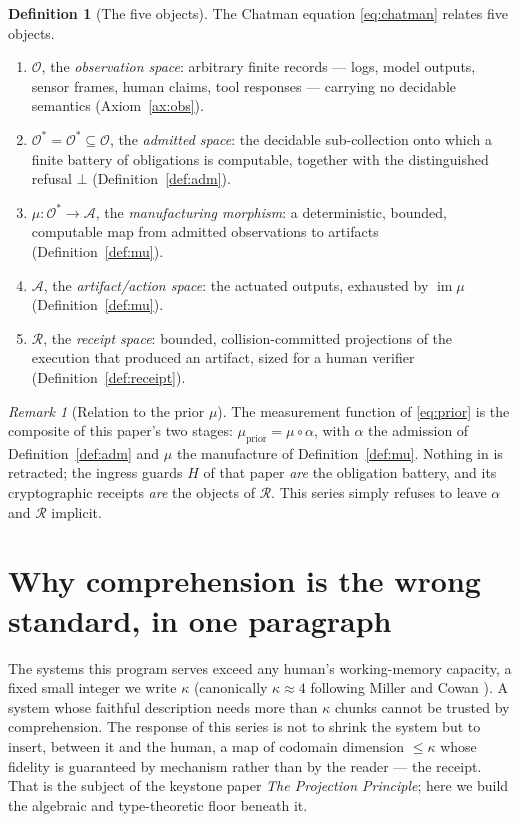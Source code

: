 \documentclass[11pt,oneside]{book}
\theoremstyle{definition}
\newtheorem{definition}{Definition}[chapter]
\theoremstyle{plain}
\theoremstyle{remark}
\newtheorem*{remark}{Remark}
\newcommand{\Obs}{\mathcal{O}}                 %
\newcommand{\Adm}{\mathcal{O}^{*}}             %
\newcommand{\Act}{\mathcal{A}}                 %
\newcommand{\Rec}{\mathcal{R}}                 %
\newcommand{\muop}{\mu}                        %
\newcommand{\adm}{\alpha}                      %
\newcommand{\Rfsl}{\bot}                        %
\newcommand{\CL}{\kappa}                       %
\DeclareMathOperator{\im}{im}
\begin{document}
\begin{definition}[The five objects]\label{def:five}
The Chatman equation \eqref{eq:chatman} relates five objects.
\begin{enumerate}[label=(\roman*),leftmargin=*]
  \item $\Obs$, the \emph{observation space}: arbitrary finite records --- logs, model
        outputs, sensor frames, human claims, tool responses --- carrying no decidable
        semantics (Axiom~\ref{ax:obs}).
  \item $\Adm=\Obs^{*}\subseteq\Obs$, the \emph{admitted space}: the decidable
        sub-collection onto which a finite battery of obligations is computable, together
        with the distinguished refusal $\Rfsl$ (Definition~\ref{def:adm}).
  \item $\muop:\Adm\to\Act$, the \emph{manufacturing morphism}: a deterministic, bounded,
        computable map from admitted observations to artifacts
        (Definition~\ref{def:mu}).
  \item $\Act$, the \emph{artifact/action space}: the actuated outputs, exhausted by
        $\im\muop$ (Definition~\ref{def:mu}).
  \item $\Rec$, the \emph{receipt space}: bounded, collision-committed projections of the
        execution that produced an artifact, sized for a human verifier
        (Definition~\ref{def:receipt}).
\end{enumerate}
\end{definition}

\begin{remark}[Relation to the prior $\muop$]
The measurement function of \eqref{eq:prior} is the composite of this paper's two stages:
$\muop_{\text{prior}} = \muop\circ\adm$, with $\adm$ the admission of
Definition~\ref{def:adm} and $\muop$ the manufacture of Definition~\ref{def:mu}. Nothing
in \cite{chatman2025} is retracted; the ingress guards $H$ of that paper \emph{are} the
obligation battery, and its cryptographic receipts \emph{are} the objects of $\Rec$. This
series simply refuses to leave $\adm$ and $\Rec$ implicit.
\end{remark}

\section{Why comprehension is the wrong standard, in one paragraph}

The systems this program serves exceed any human's working-memory capacity, a fixed small
integer we write $\CL$ (canonically $\CL\approx4$ following Miller and Cowan
\cite{miller1956,cowan2001}). A system whose faithful description needs more than $\CL$
chunks cannot be trusted by comprehension. The response of this series is not to shrink the
system but to insert, between it and the human, a map of codomain dimension $\le\CL$ whose
fidelity is guaranteed by mechanism rather than by the reader --- the receipt. That is the
subject of the keystone paper \emph{The Projection Principle}; here we build the algebraic
and type-theoretic floor beneath it.
\end{document}
